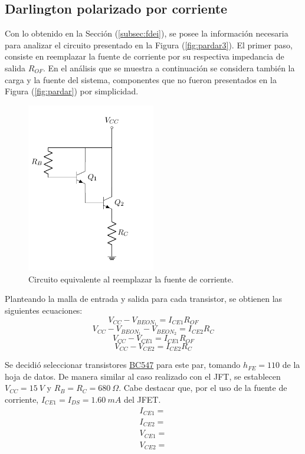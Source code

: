 \subsection{Darlington polarizado por corriente}
Con lo obtenido en la Sección (\ref{subsec:fdei}), se posee la información necesaria para analizar el circuito presentado en la Figura (\ref{fig:pardar3}). El primer paso, consiste en reemplazar la fuente de corriente por su respectiva impedancia de salida $R_{OF}$. En el análisis que se muestra a continuación se considera también la carga y la fuente del sistema, componentes que no fueron presentados en la Figura (\ref{fig:pardar}) por simplicidad.
\begin{figure}[H]
\centering
	\includegraphics[width=0.5\textwidth, page=5]{Imagenes/ParDarlington.pdf}
	\caption{Circuito equivalente al reemplazar la fuente de corriente.}
	\label{fig:pardar4}
\end{figure}

Planteando la malla de entrada y salida para cada transistor, se obtienen las siguientes ecuaciones:
\begin{equation*}
	V_{CC} - V_{BEON_1} = I_{CE1} R_{OF}
\end{equation*}
\begin{equation*}
	V_{CC} - V_{BEON_1} - V_{BEON_2} = I_{CE2} R_{C}
\end{equation*}
\begin{equation*}
	V_{CC} - V_{CE1} = I_{CE1} R_{OF}
\end{equation*}
\begin{equation*}
	V_{CC} - V_{CE2} = I_{CE2} R_{C}
\end{equation*}

Se decidió seleccionar transistores \href{https://www.sparkfun.com/datasheets/Components/BC546.pdf}{BC547} para este par, tomando $h_{FE} = 110$ de la hoja de datos. De manera similar al caso realizado con el JFT, se establecen $V_{CC} = 15 \ V$ y $R_B = R_C = 680 \ \Omega$. Cabe destacar que, por el uso de la fuente de corriente, $I_{CE1} = I_{DS} = 1.60 \ mA$ del JFET. 
\begin{equation*}
\begin{split}
	I_{CE1} = \\
	I_{CE2} = \\
	V_{CE1} = \\
	V_{CE2} = 
\end{split}
\end{equation*}

